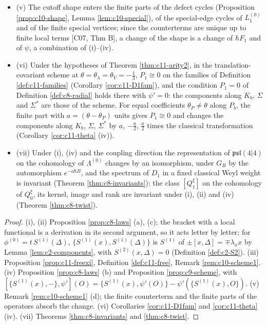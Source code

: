 \begin{proposition}
\begin{itemize}
\item (v) The cutoff shape enters the finite parts of the defect cycles (Proposition \ref{prop:c10-shape}, Lemma \ref{lem:c10-special}), of the special-edge cycles of $L_1^{(0)}$ and of the finite special vertices; since the counterterms are unique up to finite local terms [C07, Thm B], a change of the shape is a change of $\hbar F_1$ and of $\psi$, a combination of (i)--(iv).
\item (vi) Under the hypotheses of Theorem \ref{thm:c11-arity2}, in the translation-covariant scheme at $\theta=\theta_\lambda=\theta_V=-\tfrac13$, $P_1\cong0$ on the families of Definition \ref{def:c11-families} (Corollary \ref{cor:c11-D1fam}), and the condition $P_1=0$ of Definition \ref{def:c8-radial} holds there with $\psi'=0$: the components along $K_b$, $\Sigma$ and $\Sigma^*$ are those of the scheme. For equal coefficients $\theta_P\ne\theta$ along $P_b$, the finite part with $a=(\theta-\theta_P)$ units gives $P_1\cong0$ and changes the components along $K_b$, $\Sigma$, $\Sigma^*$ by $a$, $-\tfrac a2$, $\tfrac a2$ times the classical transformation (Corollary \ref{cor:c11-theta} (iv)).
\item (vii) Under (i), (iv) and the coupling direction the representation of $\mathfrak{psl}(4|4)$ on the cohomology of $\Lambda^{(0)}$ changes by an isomorphism, under $G_B$ by the automorphism $e^{-a\hbar B}$, and the spectrum of $D_1$ in a fixed classical Weyl weight is invariant (Theorem \ref{thm:c8-invariants}); the class $[Q^\xi_1]$ on the cohomology of $Q^\xi_0$, its kernel, image and rank are invariant under (i), (ii) and (iv) (Theorem \ref{thm:c8-twist}).
\end{itemize}
\end{proposition}

\begin{proof}
(i), (ii) Proposition \ref{prop:c8-laws} (a), (c); the bracket with a local functional is a derivation in its second argument, so it acts letter by letter; for $\phi^{(0)}=t\,S^{(1)}(\Delta)$, $\{S^{(1)}(x),S^{(1)}(\Delta)\}$ is $S^{(1)}$ of $\pm[x,\Delta]=\mp\lambda_xx$ by Lemma \ref{lem:c2-components}, with $S^{(2)}(x,\Delta)=0$ (Definition \ref{def:c2-S2}). (iii) Proposition \ref{prop:c11-freexi}, Definition \ref{def:c11-free}, Remark \ref{rem:c10-scheme1}. (iv) Proposition \ref{prop:c8-laws} (b) and Proposition \ref{prop:c9-scheme}, with $[\{S^{(1)}(x),-\},\psi'](O)=\{S^{(1)}(x),\psi'(O)\}-\psi'(\{S^{(1)}(x),O\})$. (v) Remark \ref{rem:c10-scheme1} (d); the finite counterterm and the finite parts of the operators absorb the change. (vi) Corollaries \ref{cor:c11-D1fam} and \ref{cor:c11-theta} (iv). (vii) Theorems \ref{thm:c8-invariants} and \ref{thm:c8-twist}.
\end{proof}

